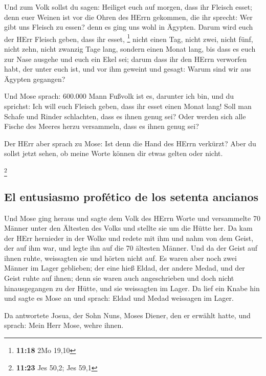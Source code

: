  Und zum Volk sollst du sagen: Heiliget euch auf morgen,
dass ihr Fleisch esset; denn euer Weinen ist vor die Ohren des HErrn
gekommen, die ihr sprecht: Wer gibt uns Fleisch zu essen? denn es ging
uns wohl in Ägypten. Darum wird euch der HErr Fleisch geben, dass ihr
esset, \footnote{\textbf{11:18} 2Mo 19,10}  nicht einen
Tag, nicht zwei, nicht fünf, nicht zehn, nicht zwanzig Tage lang,
 sondern einen Monat lang, bis dass es euch zur Nase
ausgehe und euch ein Ekel sei; darum dass ihr den HErrn verworfen habt,
der unter euch ist, und vor ihm geweint und gesagt: Warum sind wir aus
Ägypten gegangen?

 Und Mose sprach: 600.000 Mann Fußvolk ist es, darunter
ich bin, und du sprichst: Ich will euch Fleisch geben, dass ihr esset
einen Monat lang!  Soll man Schafe und Rinder schlachten,
dass es ihnen genug sei? Oder werden sich alle Fische des Meeres herzu
versammeln, dass es ihnen genug sei?

 Der HErr aber sprach zu Mose: Ist denn die Hand des
HErrn verkürzt? Aber du sollst jetzt sehen, ob meine Worte können dir
etwas gelten oder nicht.

\footnote{\textbf{11:23} Jes 50,2; Jes 59,1}

\hypertarget{el-entusiasmo-profuxe9tico-de-los-setenta-ancianos}{%
\subsection{El entusiasmo profético de los setenta
ancianos}\label{el-entusiasmo-profuxe9tico-de-los-setenta-ancianos}}

 Und Mose ging heraus und sagte dem Volk des HErrn Worte
und versammelte 70 Männer unter den Ältesten des Volks und stellte sie
um die Hütte her.  Da kam der HErr hernieder in der Wolke
und redete mit ihm und nahm von dem Geist, der auf ihm war, und legte
ihn auf die 70 ältesten Männer. Und da der Geist auf ihnen ruhte,
weissagten sie und hörten nicht auf.  Es waren aber noch
zwei Männer im Lager geblieben; der eine hieß Eldad, der andere Medad,
und der Geist ruhte auf ihnen; denn sie waren auch angeschrieben und
doch nicht hinausgegangen zu der Hütte, und sie weissagten im Lager.
 Da lief ein Knabe hin und sagte es Mose an und sprach:
Eldad und Medad weissagen im Lager.

 Da antwortete Josua, der Sohn Nuns, Moses Diener, den er
erwählt hatte, und sprach: Mein Herr Mose, wehre ihnen.


